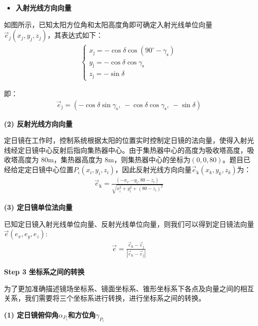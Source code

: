\documentclass[../main.tex]{subfiles}
\begin{document}
  \begin{itemize}
  \item \textbf{入射光线方向向量}
  \end{itemize}
\par 如图所示，已知太阳方位角和太阳高度角即可确定入射光线单位向量$\vec{e}_j (x_j, y_j, z_j)$，其表达式如下：
\begin{align}    \label{1.8}
\begin{cases}
x_{\text{j}} = -\cos\delta\cos(90^{\circ} - \gamma_{\text{s}}) \\
y_{\text{j}} = -\cos\delta\cos\gamma_{\text{s}} \\
z_{\text{j}} = -\sin\delta
\end{cases}
\end{align}
\par 即：
\begin{align}    \label{1.9}
\vec{e}_{\text{j}} = (-\cos\delta\sin\gamma_{\text{s}},\ -\cos\delta\cos\gamma_{\text{s}},\ -\sin\delta)
\end{align}
\par \textbf{(2) 反射光线方向向量}
\par 定日镜在工作时，控制系统根据太阳的位置实时控制定日镜的法向量，使得入射光线经定日镜中心反射后指向集热器中心。由于集热器中心的高度为吸收塔高度，吸收塔高度为 80m，集热器高度为 8m，则集热器中心的坐标为$(0,0,80)$。题目已经给定定日镜中心位置$P_{i}(x_i,y_i,z_i)$，因此反射光线方向向量$\vec{e}_{\text{k}}(x_k,y_k,z_k)$为：
\begin{align}    \label{1.10}
\vec{e}_{\text{k}} = \frac{(-x_i, -y_i, 80 - z_i)}{\sqrt{x_i^2 + y_i^2 + (80 - z_i)^2}}
\end{align}
\par \textbf{(3) 定日镜单位法向量}
\par 已知定日镜入射光线单位向量、反射光线单位向量，则我们可以得到定日镜法向量$\vec{e}(e_x,e_y,e_z)$:
\begin{align}    \label{1.11}
\vec{e} = \frac{\vec{e}_{\text{k}} - \vec{e}_{\text{j}}}{|\vec{e}_{\text{k}} - \vec{e}_{\text{j}}|}
\end{align}



  \noindent \textbf{Step 3 坐标系之间的转换}
\par 为了更加准确描述镜场坐标系、镜面坐标系、锥形坐标系下各点及向量之间的相互关系，我们需要将三个坐标系进行转换，进行坐标系之间的转换。
\par \textbf{(1) 定日镜俯仰角$\alpha_{P_{i}}$和方位角$\gamma_{P_{i}}$}
\end{document}
